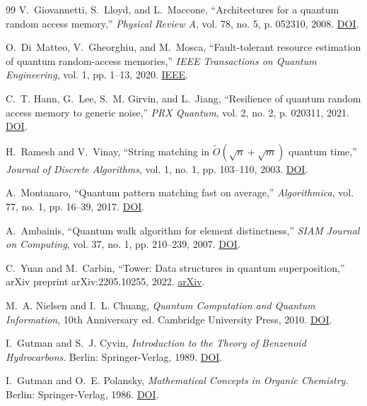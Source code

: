 \documentclass[11pt,letterpaper]{article}
\begin{document}
\begin{thebibliography}{99}
V.~Giovannetti, S.~Lloyd, and L.~Maccone, ``Architectures for a quantum random access memory,'' \emph{Physical Review A}, vol. 78, no. 5, p. 052310, 2008. \href{https://doi.org/10.1103/PhysRevA.78.052310}{DOI}.

O.~Di~Matteo, V.~Gheorghiu, and M.~Mosca, ``Fault-tolerant resource estimation of quantum random-access memories,'' \emph{IEEE Transactions on Quantum Engineering}, vol. 1, pp. 1--13, 2020. \href{https://tqe.ieee.org/2020/01/17/fault-tolerant-resource-estimation-of-quantum-random-access-memories/}{IEEE}.

C.~T. Hann, G.~Lee, S.~M. Girvin, and L.~Jiang, ``Resilience of quantum random access memory to generic noise,'' \emph{PRX Quantum}, vol. 2, no. 2, p. 020311, 2021. \href{https://doi.org/10.1103/PRXQuantum.2.020311}{DOI}.

H.~Ramesh and V.~Vinay, ``String matching in $\tilde{O}(\sqrt{n} + \sqrt{m})$ quantum time,'' \emph{Journal of Discrete Algorithms}, vol. 1, no. 1, pp. 103--110, 2003. \href{https://doi.org/10.1016/S1570-8667(03)00010-8}{DOI}.

A.~Montanaro, ``Quantum pattern matching fast on average,'' \emph{Algorithmica}, vol. 77, no. 1, pp. 16--39, 2017. \href{https://doi.org/10.1007/s00453-015-0060-4}{DOI}.

A.~Ambainis, ``Quantum walk algorithm for element distinctness,'' \emph{SIAM Journal on Computing}, vol. 37, no. 1, pp. 210--239, 2007. \href{https://doi.org/10.1137/S0097539705447311}{DOI}.

C.~Yuan and M.~Carbin, ``Tower: Data structures in quantum superposition,'' arXiv preprint arXiv:2205.10255, 2022. \href{https://arxiv.org/abs/2205.10255}{arXiv}.

M.~A. Nielsen and I.~L. Chuang, \emph{Quantum Computation and Quantum Information}, 10th Anniversary ed. Cambridge University Press, 2010. \href{https://doi.org/10.1017/CBO9780511976667}{DOI}.

I.~Gutman and S.~J. Cyvin, \emph{Introduction to the Theory of Benzenoid Hydrocarbons}. Berlin: Springer-Verlag, 1989. \href{https://doi.org/10.1007/978-3-642-87143-6}{DOI}.

I.~Gutman and O.~E. Polansky, \emph{Mathematical Concepts in Organic Chemistry}. Berlin: Springer-Verlag, 1986. \href{https://doi.org/10.1007/978-3-642-70982-1}{DOI}.


\end{thebibliography}
\end{document}
